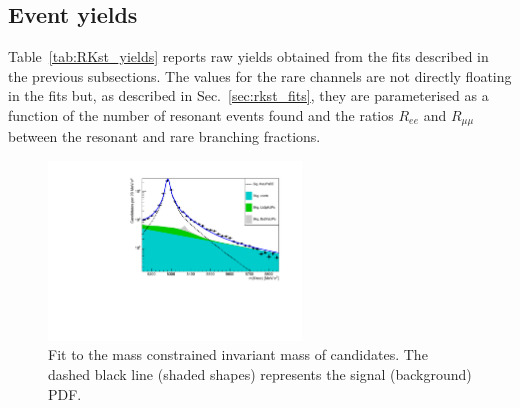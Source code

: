 \subsection{Event yields}

Table~\ref{tab:RKst_yields} reports raw yields obtained from the
fits described in the previous subsections. The values for the rare channels are not
directly floating in the fits but, as described in Sec.~\ref{sec:rkst_fits}, they are parameterised
as a function of the number of resonant events found and the ratios $R_{ee}$ and $R_{\mu\mu}$
between the resonant and rare branching fractions. 



\begin{table}[t]
\centering
\caption{Raw yields of events found fitting invariant mass distributions of the rare and resonant events. }
\renewcommand\arraystretch{1.25}
\label{tab:RKst_yields}
\end{table}

\begin{figure}[h!]
\centering
\includegraphics[width=0.6\textwidth]{RKst/figs/Fit/fit_EE/fit_JPs_L_log.pdf}
\caption{Fit to the mass constrained \mKpiee invariant mass of \BdToKstJPsee candidates.
The dashed black line (shaded shapes) represents the signal (background) PDF.}
\label{fig:fitJPsEE}
\end{figure}


